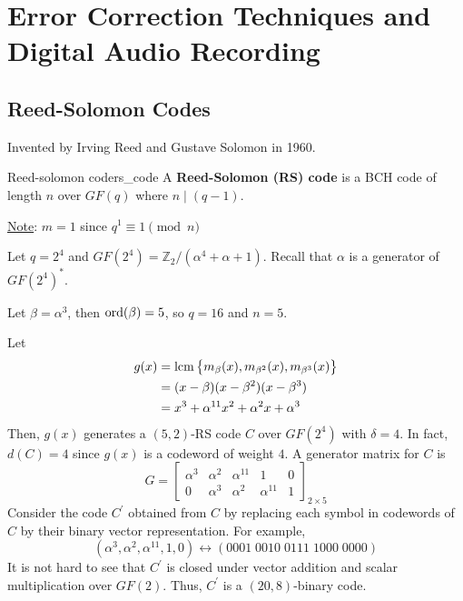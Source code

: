 \chapter{Error Correction Techniques and Digital Audio Recording}
\section{Reed-Solomon Codes}
Invented by Irving Reed and Gustave Solomon in 1960.

\begin{Definition}{Reed-solomon code}{rs_code}
    A \textbf{Reed-Solomon (RS) code} is a BCH code
    of length $ n $ over $ GF(q) $ where $ n\mid (q-1) $.

    \underline{Note}: $ m=1 $ since $ q^1\equiv 1\pmod{n} $
\end{Definition}

\begin{Example}{}{}
    Let $ q=2^4 $ and $ GF(2^4)=\mathbb{Z}_2/(\alpha^4+\alpha+1) $.
    Recall that $ \alpha $ is a generator of $ GF(2^4)^* $.

    Let $ \beta=\alpha^3 $, then $ \operatorname{ord}(\beta)=5 $, so $ q=16 $
    and $ n=5 $.

    Let
    \begin{align*}
        g(x) & =\operatorname{lcm} \left\{ m_{\beta}(x),m_{\beta^2}(x),m_{\beta^3}(x)\right\} \\
             & =(x-\beta)(x-\beta^2)(x-\beta^3)                                 \\
             & =x^3+\alpha^{11}x^2+\alpha^2x+\alpha^3
    \end{align*}
    Then, $ g(x) $ generates a $ (5,2) $-RS code $ C $ over $ GF(2^4) $
    with $ \delta=4 $. In fact, $ d(C)=4 $ since $ g(x) $
    is a codeword of weight $ 4 $. A generator matrix for $ C $ is
    \[ G=
        \begin{bmatrix}
            \alpha^3 & \alpha^2 & \alpha^{11} & 1           & 0 \\
            0        & \alpha^3 & \alpha^2    & \alpha^{11} & 1
        \end{bmatrix}_{2\times 5} \]
    Consider the code $ C^{\prime} $ obtained from $ C $
    by replacing each symbol in codewords of $ C $ by their binary vector representation.
    For example,
    \[ (\alpha^3,\alpha^2,\alpha^{11},1,0)\longleftrightarrow (0001\; 0010\; 0111\; 1000\; 0000) \]
    It is not hard to see that $ C^{\prime} $ is closed under vector addition and scalar
    multiplication over $ GF(2) $. Thus, $ C^{\prime} $ is a $ (20,8) $-binary code.
\end{Example}

